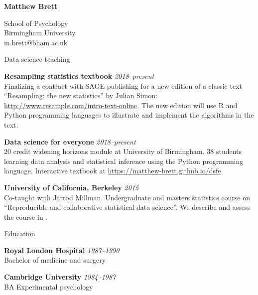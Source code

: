 \documentclass{cv}
\newcommand{\PlaceDate}[2]{{\bf #1} \hfill {\em #2} \\}
\newcommand{\PlaceDateNote}[3]{{\bf #1} \hfill {\em #2} \\#3}
\newcommand{\UCB}{University of California, Berkeley}
\newcommand{\UoB}{University of Birmingham}
\begin{document}
\nocite{*}

{\huge \bf Matthew Brett}

School of Psychology \\
Birmingham University \\
m.brett@bham.ac.uk

\begin{cvSection}{Data science teaching}

\PlaceDate{Resampling statistics textbook}{2018--present}
    {Finalizing a contract with SAGE publishing for a new edition of a classic
    text ``Resampling: the new statistics'' by Julian Simon:
    \url{http://www.resample.com/intro-text-online}. The new edition will use
    R and Python programming languages to illustrate and implement the
    algorithms in the text}.

\PlaceDate{Data science for everyone}{2018--present}
    {20 credit widening horizons module at \UoB. 38 students learning data
    analysis and statistical inference using the Python programming language.
    Interactive textbook at \url{https://matthew-brett.github.io/dsfe}.}

\PlaceDateNote{\UCB}{2015}
{Co-taught with Jarrod Millman.  Undergraduate and masters statistics course
on ``Reproducible and collaborative statistical data science''. We describe
    and assess the course in \cite{millman2018rcsds}.}

\end{cvSection}

\begin{cvSection}{Education}

\PlaceDate{Royal London Hospital}{1987--1990 }
Bachelor of medicine and surgery

\PlaceDateNote{Cambridge University}{1984--1987 }{
BA Experimental psychology}

\end{cvSection}
\end{document}
